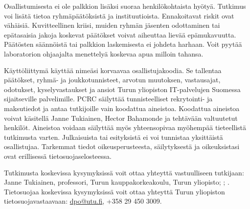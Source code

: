 Osallistumisesta ei ole palkkion lisäksi suoraa henkilökohtaista hyötyä. Tutkimus voi lisätä tietoa ryhmäpäätöksistä ja instituutioista. Ennakoitavat riskit ovat vähäisiä. Kuvitteellinen kriisi, muiden ryhmän jäsenten odottaminen tai epätasaisia jakoja koskevat päätökset voivat aiheuttaa lievää epämukavuutta. Päätösten säännöistä tai palkkion laskemisesta ei johdeta harhaan. Voit pyytää laboratorion ohjaajalta menettelyä koskevaa apua milloin tahansa.

Käyttöliittymä käyttää nimeäsi korvaavaa osallistujakoodia. Se tallentaa päätökset, ryhmä- ja joukkotunnisteet, arvotun muutoksen, vastausajat, odotukset, kyselyvastaukset ja ansiot Turun yliopiston IT-palvelujen Suomessa sijaitseville palvelimille. PCRC säilyttää tunnisteelliset rekrytointi- ja maksutiedot ja antaa tutkijoille vain koodattua aineistoa. Koodattua aineistoa voivat käsitellä Janne Tukiainen, Hector Bahamonde ja tehtävään valtuutetut henkilöt. Aineistoa voidaan säilyttää myös yhteensopivaa myöhempää tieteellistä tutkimusta varten. Julkaisuista tai esityksistä ei voi tunnistaa yksittäistä osallistujaa. Tarkemmat tiedot oikeusperusteesta, säilytyksestä ja oikeuksistasi ovat erillisessä tietosuojaselosteessa.

Tutkimusta koskevissa kysymyksissä voit ottaa yhteyttä vastuulliseen tutkijaan: Janne Tukiainen, professori, Turun kauppakorkeakoulu, Turun yliopisto; \StudyEmail; \StudyPhone. Tietosuojaa koskevissa kysymyksissä voit ottaa yhteyttä Turun yliopiston tietosuojavastaavaan: \href{mailto:dpo@utu.fi}{dpo@utu.fi}, +358 29 450 3009.


